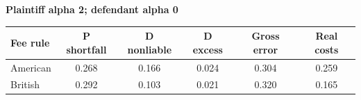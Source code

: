 \documentclass[10pt,border=5pt,varwidth=17cm]{standalone}
\begin{document}
\begingroup
\small
\setlength{\tabcolsep}{5pt}
\renewcommand{\arraystretch}{1.20}
\noindent\textbf{Plaintiff alpha 2; defendant alpha 0}\par\smallskip
\noindent\begin{tabularx}{\linewidth}{@{}>{\raggedright\arraybackslash}Xccccc@{}}
\toprule
\textbf{Fee rule} & \textbf{P shortfall} & \textbf{D nonliable} & \textbf{D excess} & \textbf{Gross error} & \textbf{Real costs} \\
\midrule
American & 0.268 & 0.166 & 0.024 & 0.304 & 0.259 \\
British & 0.292 & 0.103 & 0.021 & 0.320 & 0.165 \\
\bottomrule\end{tabularx}\par\medskip
\endgroup
\end{document}
